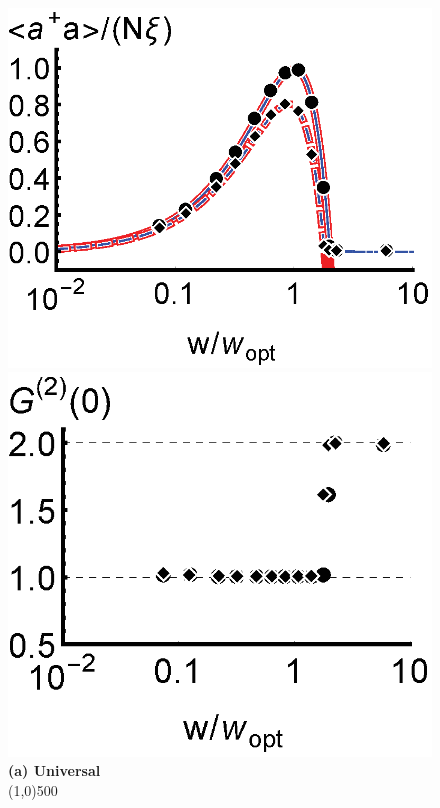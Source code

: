 \documentclass[aps,prl,twocolumn,
superscriptaddress,groupedaddress]{revtex4}
\begin{document}
\begin{figure}
\begin{center}
	\hspace{-6.5mm} \includegraphics[scale =0.445] {N10000ada.eps}
	\hspace{-5.5mm} \includegraphics[scale =0.445] {N10000G2S.eps}\\
	\textbf{(a) Universal}\\
	\line(1,0){500}\\

\end{center}
\end{figure}
\end{document}
